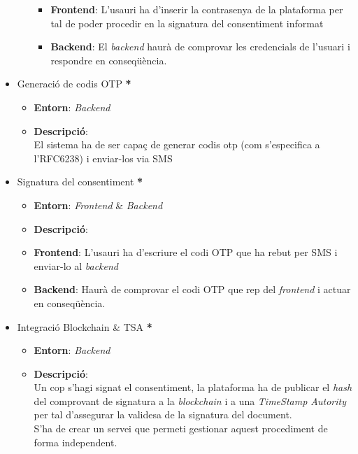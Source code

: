 \begin{itemize}
\begin{itemize}
\begin{itemize}
                \item \textbf{Frontend}: L'usauri ha d'inserir la contrasenya de la plataforma per tal de poder procedir en la signatura del consentiment informat
                \item \textbf{Backend}: El \textit{backend} haurà de comprovar les credencials de l'usuari i respondre en conseqüència.
            \end{itemize}
        \end{itemize}
    \item Generació de codis OTP \textbf{*}
        \begin{itemize}
            \item \textbf{Entorn}: \textit{Backend}
            \item \textbf{Descripció}: \\
            El sistema ha de ser capaç de generar codis otp (com s'especifica a l'RFC6238) i enviar-los via SMS
        \end{itemize}
    \item Signatura del consentiment \textbf{*}
        \begin{itemize}
            \item \textbf{Entorn}: \textit{Frontend} \& \textit{Backend} 
            \item \textbf{Descripció}:
            \item \textbf{Frontend}: L'usauri ha d'escriure el codi OTP que ha rebut per SMS i enviar-lo al \textit{backend}
                \item \textbf{Backend}: Haurà de comprovar el codi OTP que rep del \textit{frontend} i actuar en conseqüència.
        \end{itemize}
    \item Integració Blockchain \& TSA \textbf{*}
        \begin{itemize}
            \item \textbf{Entorn}: \textit{Backend}
            \item \textbf{Descripció}: \\
            Un cop s'hagi signat el consentiment, la plataforma ha de publicar el \textit{hash} del comprovant de signatura a la \textit{blockchain} i a una \textit{TimeStamp Autority} per tal d'assegurar la validesa de la signatura del document.\\
            S'ha de crear un servei que permeti gestionar aquest procediment de forma independent.
        \end{itemize}

\end{itemize}
